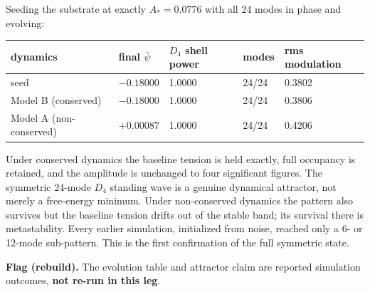 \documentclass[11pt,a4paper]{article}
\newcommand{\flagbox}[1]{\par\smallskip\noindent\textbf{Flag (rebuild).} #1\par\smallskip}
\begin{document}
Seeding the substrate at exactly $A_* = 0.0776$ with all 24 modes in phase and evolving:
\begin{center}
\begin{tabular}{lllll}
\toprule
dynamics & final $\bar{\psi}$ & $D_4$ shell power & modes & rms modulation \\
\midrule
seed & $-0.18000$ & 1.0000 & 24/24 & 0.3802 \\
Model B (conserved) & $-0.18000$ & 1.0000 & 24/24 & 0.3806 \\
Model A (non-conserved) & $+0.00087$ & 1.0000 & 24/24 & 0.4206 \\
\bottomrule
\end{tabular}
\end{center}
Under conserved dynamics the baseline tension is held exactly, full occupancy is retained, and the amplitude is unchanged to four significant figures. The symmetric 24-mode $D_4$ standing wave is a genuine dynamical attractor, not merely a free-energy minimum. Under non-conserved dynamics the pattern also survives but the baseline tension drifts out of the stable band; its survival there is metastability. Every earlier simulation, initialized from noise, reached only a 6- or 12-mode sub-pattern. This is the first confirmation of the full symmetric state.
\flagbox{The evolution table and attractor claim are reported simulation outcomes, \textbf{not re-run in this leg}.}
\end{document}
